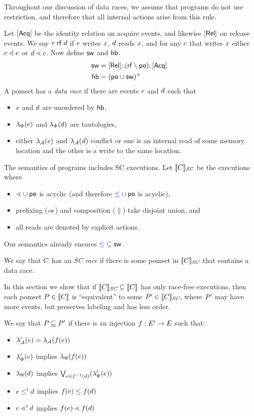 Throughout our discussion of data races, we assume that programs do not use
restriction, and therefore that all internal actions arise from this rule.



Let $[\mathsf{Acq}]$ be the identity relation on acquire events, and likewise $[\mathsf{Rel}]$ on release events.
We say $e\mathrel{\mathsf{rf}}d$ if $e$ writes $x$, $d$ reads $x$, and for any $c$ that writes $x$ either $c\lessdot e$ or $d\lessdot c$.
Now define $\mathrel{\mathsf{sw}}$ and $\mathrel{\mathsf{hb}}$.
\begin{align*}
  {\ensuremath{\mathrel{\mathsf{sw}}}} &= [\mathsf{Rel}]; ({\mathrel{\mathsf{rf}}}\setminus{\ensuremath{\mathrel{\mathsf{po}}}}); [\mathsf{Acq}]
  \\
  {\mathrel{\mathsf{hb}}} &= ({\mathrel{\mathsf{po}}} \cup {\ensuremath{\mathrel{\mathsf{sw}}}})^+
\end{align*}
A pomset has a \emph{data race} if there are events
$e$ and $d$ such that 
\begin{itemize}
\item $e$ and $d$ are unordered by $\mathrel{\mathsf{hb}}$,
\item $\lambda_{\Phi}(e)$ and $\lambda_{\Phi}(d)$ are tautologies,
\item either $\lambda_{\mathcal{A}}(e)$ and $\lambda_{\mathcal{A}}(d)$ conflict or one is
  an internal read of some memory location and the other is a write to the
  same location.
\end{itemize}

The semantics of programs includes SC executions.  Let $\llbracket C\rrbracket_{\textit{SC}}$ be the
executions where
\begin{itemize}
\item ${\lessdot}\cup{\ensuremath{\mathrel{\mathsf{po}}}}$ is acyclic (and therefore ${\mathrel{{\color{blue}\leq}}}\cup{\ensuremath{\mathrel{\mathsf{po}}}}$ is acyclic),
\item prefixing ($\mathbin\Rightarrow$) and composition ($\parallel$) take disjoint union, and
\item all reads are denoted by explicit actions.
\end{itemize}
Our semantics already ensures ${\mathrel{{\color{blue}\leq}}}\subseteq{\ensuremath{\mathrel{\mathsf{sw}}}}$.

We say that $C$ has an \emph{SC race} if there is some pomset in $\llbracket C\rrbracket_{\textit{SC}}$
that contains a data race.

In this section we show that if $\llbracket C\rrbracket_{\textit{SC}}\subseteq\llbracket C\rrbracket$ has only
race-free executions, then each pomset $P\in\llbracket C\rrbracket$ is ``equivalent''
to some $P'\in\llbracket C\rrbracket_{\textit{SC}}$, where $P'$ may have more events, but
preserves labeling and has less order.

We say that $P\sqsubseteq P'$ if there is an injection
$f:E'\rightarrow E$ such that:
\begin{itemize}
\item $\lambda_{\mathcal{A}}'(e) = \lambda_{\mathcal{A}}(f(e))$
\item $\lambda_{\Phi}'(e)$ implies $\lambda_{\Phi}(f(e))$
\item $\lambda_{\Phi}(d)$ implies $\bigvee_{e\in f^{-1}(d)}(\lambda_{\Phi}'(e))$
\item $e\mathrel{{\color{blue}\leq}}'d$ implies $f(e)\mathrel{{\color{blue}\leq}}f(d)$
\item $e\lessdot'd$ implies $f(e)\lessdot f(d)$
\end{itemize}


